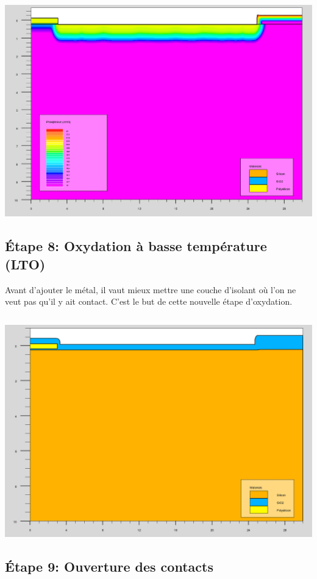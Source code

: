 \documentclass{article}
\begin{document}
\includegraphics[width=\linewidth]{7_dopage.png}

\subsection{Étape 8: Oxydation à basse température (LTO)}
Avant d’ajouter le métal, il vaut mieux mettre une couche d’isolant où l’on ne veut pas qu’il y ait contact. C’est le but de cette nouvelle étape d’oxydation.

\inputminted[linenos,firstnumber=75,firstline=75,lastline=79]{sh}{final_named.in}

\includegraphics[width=\linewidth]{8croissance_oxide.png}

\subsection{Étape 9: Ouverture des contacts}
\end{document}
